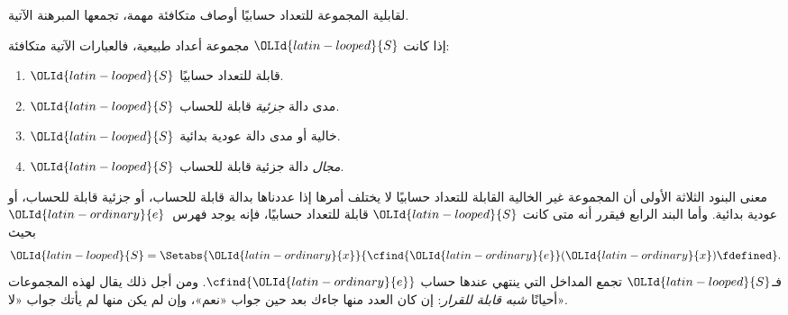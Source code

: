 \documentclass[../../../include/open-logic-section]{subfiles}
\begin{document}


لقابلية المجموعة للتعداد حسابيًا أوصاف متكافئة مهمة، تجمعها
المبرهنة الآتية.

\begin{thm}
إذا كانت $\OLId{latin-looped}{S}$ مجموعة أعداد طبيعية، فالعبارات الآتية متكافئة:
\begin{enumerate}
\item{} $\OLId{latin-looped}{S}$ قابلة للتعداد حسابيًا.
\item{} $\OLId{latin-looped}{S}$ مدى دالة \emph{جزئية} قابلة للحساب.
\item{} $\OLId{latin-looped}{S}$ خالية أو مدى دالة عودية بدائية.
\item{} $\OLId{latin-looped}{S}$ \emph{مجال} دالة جزئية قابلة للحساب.
\end{enumerate}
\end{thm}

\begin{explain}
معنى البنود الثلاثة الأولى أن المجموعة غير
الخالية القابلة للتعداد حسابيًا لا يختلف أمرها إذا عددناها بدالة قابلة للحساب، أو جزئية
قابلة للحساب، أو عودية بدائية. وأما البند الرابع فيقرر أنه متى كانت
$\OLId{latin-looped}{S}$ قابلة للتعداد حسابيًا، فإنه يوجد فهرس~$\OLId{latin-ordinary}{e}$ بحيث
\[
\OLId{latin-looped}{S} = \Setabs{\OLId{latin-ordinary}{x}}{\cfind{\OLId{latin-ordinary}{e}}(\OLId{latin-ordinary}{x}) \fdefined}.
\]
فـ$\OLId{latin-looped}{S}$ تجمع المداخل التي ينتهي عندها حساب
$\cfind{\OLId{latin-ordinary}{e}}$. ومن أجل ذلك يقال لهذه المجموعات أحيانًا
\emph{شبه قابلة للقرار}: إن كان العدد منها جاءك بعد حين جواب
«نعم»، وإن لم يكن منها لم يأتك جواب «لا».{}
\end{explain}
\end{document}
